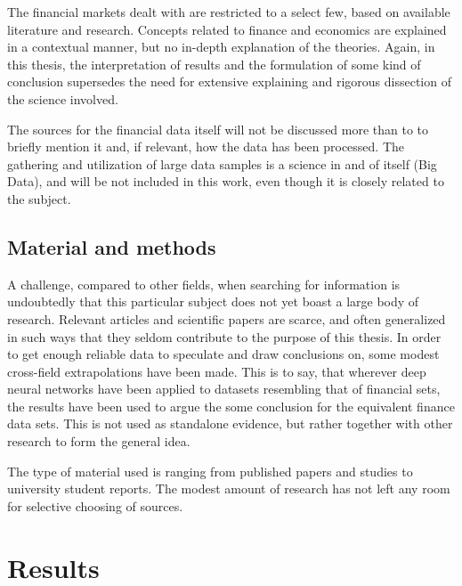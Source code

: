 The financial markets dealt with are restricted to a select few, based on available literature and research. Concepts related to finance and economics are explained in a contextual manner, but no in-depth explanation of the theories. Again, in this thesis, the interpretation of results and the formulation of some kind of conclusion supersedes the need for extensive explaining and rigorous dissection of the science involved.

The sources for the financial data itself will not be discussed more than to to briefly mention it and, if relevant, how the data has been processed. The gathering and utilization of large data samples is a science in and of itself (Big Data), and will be not included in this work, even though it is closely related to the subject.


\subsection{Material and methods}


A challenge, compared to other fields, when searching for information is undoubtedly that this particular subject does not yet boast a large body of research. Relevant articles and scientific papers are scarce, and often generalized in such ways that they seldom contribute to the purpose of this thesis. In order to get enough reliable data to speculate and draw conclusions on, some modest cross-field extrapolations have been made. This is to say, that wherever deep neural networks have been applied to datasets resembling that of financial sets, the results have been used to argue the some conclusion for the equivalent finance data sets. This is not used as standalone evidence, but rather together with other research to form the general idea.

The type of material used is ranging from published papers and studies to university student reports. The modest amount of research has not left any room for selective choosing of sources.




\newpage

\section{Results}
